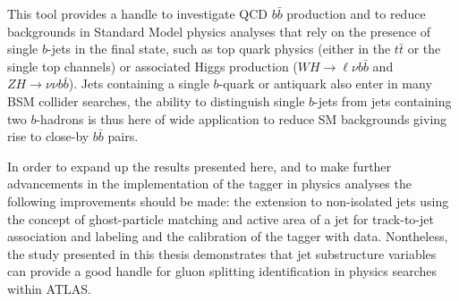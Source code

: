 This tool provides a handle to investigate QCD $b\bar{b}$ production and to reduce backgrounds in %
 Standard Model physics analyses that rely on the presence of single $b$-jets in the final state, such as top quark physics (either in the $t\bar{t}$ or the single top channels) or associated Higgs production ($WH\rightarrow\ell\nu b\bar{b}$ and $ZH\rightarrow\nu\nu b\bar{b}$). %
 Jets containing a single $b$-quark or antiquark %
also enter in many BSM collider searches, the ability to distinguish single $b$-jets from jets containing two $b$-hadrons is thus here of wide application to reduce SM backgrounds giving rise to close-by $b\bar{b}$ pairs.

In order to expand up the results presented here, and to make further advancements in the implementation of the tagger in physics analyses the following improvements should be made: the extension to non-isolated jets using the concept of ghost-particle matching and active area of a jet for track-to-jet association and labeling and the calibration of the tagger with data. %
Nontheless, the study presented in this thesis demonstrates that jet substructure variables can provide a good handle for gluon splitting identification in physics searches within ATLAS.






